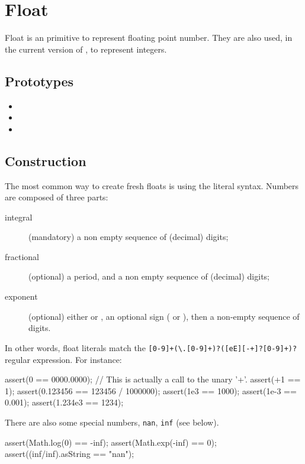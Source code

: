 \section{Float}

Float is an \us primitive to represent floating point number.  They
are also used, in the current version of \us, to represent integers.

\subsection{Prototypes}

\begin{itemize}
\item {}
\item {}
\item {}
\end{itemize}

\subsection{Construction}
\label{sec:float:ctor}

The most common way to create fresh floats is using the literal
syntax.  Numbers are composed of three parts:
\begin{description}
\item[integral] (mandatory) a non empty sequence of (decimal) digits;
\item[fractional] (optional) a period, and a non empty sequence of
  (decimal) digits;
\item[exponent] (optional) either  or , an optional
  sign (\samp{+} or \samp{-}), then a non-empty sequence of digits.
\end{description}

In other words, float literals match the
\lstinline|[0-9]+(\.[0-9]+)?([eE][-+]?[0-9]+)?|
regular expression.  For instance:

\begin{urbiscript}
assert(0 == 0000.0000);
// This is actually a call to the unary '+'.
assert(+1 == 1);
assert(0.123456 == 123456 / 1000000);
assert(1e3 == 1000);
assert(1e-3 == 0.001);
assert(1.234e3 == 1234);
\end{urbiscript}

There are also some special numbers, \lstinline|nan|, \lstinline|inf|
(see below).

\begin{urbiscript}[firstnumber=last]
assert(Math.log(0) == -inf);
assert(Math.exp(-inf) == 0);
assert((inf/inf).asString == "nan");
\end{urbiscript}

